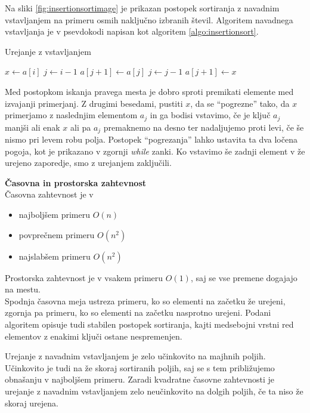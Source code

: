 \documentclass[a4paper,oneside,10pt]{article}
\newcommand{\subsubsubsection}[1]{\vspace*{1ex}\textbf{#1}\\}
\begin{document}
Na sliki \ref{fig:insertionsortimage} je prikazan postopek sortiranja z navadnim vstavljanjem na primeru osmih naključno
izbranih števil. Algoritem navadnega
vstavljanja je v psevdokodi napisan kot algoritem \ref{algo:insertionsort}.

\begin{algorithm}
  \caption{Urejanje z vstavljanjem}\label{algo:insertionsort}
  \begin{algorithmic}[1]
            \State $x \gets a[i]$
            \State $j \gets i - 1$
                \State $a[j+1] \gets a[j]$
                \State $j \gets j - 1$
            \EndWhile
            \State $a[j+1] \gets x$
        \EndFor
    \EndFunction
  \end{algorithmic}
\end{algorithm}

Med postopkom iskanja pravega mesta je dobro sproti premikati elemente med izvajanji
primerjanj. Z drugimi besedami, pustiti $x$, da se ``pogrezne'' tako, da $x$
primerjamo z naslednjim elementom $a_j$ in ga bodisi vstavimo, če je ključ $a_j$ manjši
ali enak $x$ ali pa $a_j$ premaknemo na desno ter nadaljujemo proti levi, če še nismo pri
levem robu polja. Postopek ``pogrezanja'' lahko ustavita ta dva ločena
pogoja, kot je prikazano v zgornji \emph{while} zanki.  Ko vstavimo še zadnji element v že 
urejeno zaporedje, smo z urejanjem zaključili.

\subsubsubsection{Časovna in prostorska zahtevnost}
Časovna zahtevnost je v 
\begin{itemize}
  \item najboljšem primeru $O(n)$
  \item povprečnem primeru $O(n^2)$
  \item najslabšem primeru $O(n^2)$
\end{itemize}

Prostorska zahtevnost je v vsakem primeru $O(1)$, saj se vse premene dogajajo na
mestu.\\

Spodnja časovna meja ustreza primeru, ko so elementi na začetku že urejeni, zgornja pa primeru,
ko so elementi na začetku nasprotno urejeni. Podani algoritem opisuje tudi stabilen postopek sortiranja, kajti medsebojni
vrstni red elementov z enakimi ključi ostane nespremenjen.

Urejanje z navadnim vstavljanjem je zelo učinkovito na majhnih poljih. Učinkovito je tudi na že
skoraj sortiranih poljih, saj se s tem približujemo obnašanju v najboljšem primeru.
Zaradi kvadratne časovne zahtevnosti je urejanje z navadnim vstavljanjem zelo neučinkovito na
dolgih poljih, če ta niso že skoraj urejena.
\end{document}
